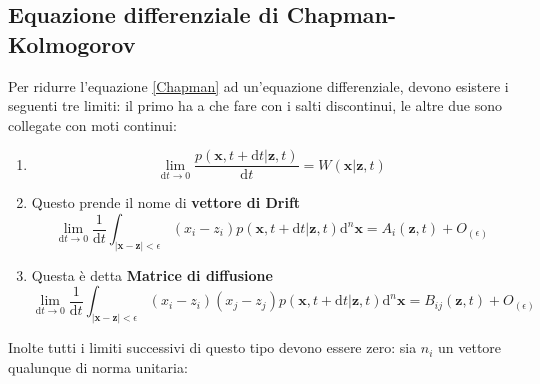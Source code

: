 \documentclass[a4paper,12pt]{article}
\renewcommand{\arg}[1]{_{(#1)}}
\theoremstyle{plain}
\renewcommand{\vec}[1]{{\boldsymbol{#1}}}
\theoremstyle{definition}
\newcommand{\f}[2]{\frac{#1}{#2}}
\renewcommand{\d}{\text{d}}
\newcommand{\pos}{\vec{x}}
\theoremstyle{remark}
\begin{document}
\subsection{Equazione differenziale di Chapman-Kolmogorov}
Per ridurre l'equazione \ref{Chapman} ad un'equazione differenziale, devono esistere i seguenti tre limiti: il primo ha a che fare con i salti discontinui, le altre due sono collegate con moti continui:\label{bbboh}
\begin{enumerate}
		\item \[	\lim_{\d t\rightarrow0}	\f{p(\pos,t+\d t|\vec{z},t)}{\d t}=W(\pos|\vec{z},t)\]
	\item  Questo prende il nome di \textbf{vettore di Drift}
	 \[	\lim_{\d t\rightarrow0}\f{1}{\d t}\int_{|\pos-\vec{z}|<\epsilon}(x_i-z_i){p(\pos,t+\d t|\vec{z},t)}   \d^n \pos=A_i(\vec{z},t)+O\arg{\epsilon}\]	
	 
	 
	 \item Questa è detta \textbf{Matrice di diffusione}
	 \[	\lim_{\d t\rightarrow0}\f{1}{\d t}\int_{|\pos-\vec{z}|<\epsilon}(x_i-z_i)(x_j-z_j){p(\pos,t+\d t|\vec{z},t)}   \d^n \pos=B_{ij}(\vec{z},t)+O\arg{\epsilon}\]
	
	
	
	
	
	
	
	
	
	
	

\end{enumerate}

Inolte tutti i limiti successivi di questo tipo devono essere zero: sia $n_i$ un vettore qualunque di norma unitaria:
\end{document}
